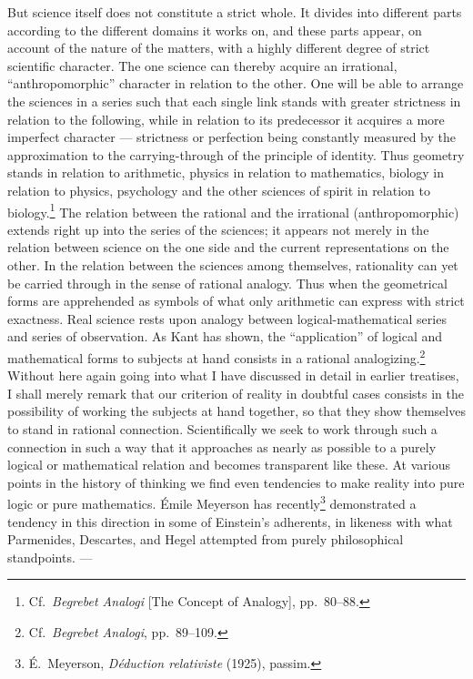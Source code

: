 \documentclass[12pt]{book}
\newcommand{\opage}[1]{\marginnote{\footnotesize\textit{[#1]}}}
\begin{document}
But science itself does not constitute a strict whole. It divides into different parts according
to the different domains it works on, and these parts appear, on account of the nature of the
matters, with a highly different degree of strict scientific character. The one science can
thereby acquire an irrational, ``anthropomorphic'' character in relation to the other. One will be
able to arrange the sciences in a series \opage{11}such that each single link stands with greater strictness
in relation to the following, while in relation to its predecessor it acquires a more imperfect
character --- strictness or perfection being constantly measured by the approximation to the
carrying-through of the principle of identity. Thus geometry stands in relation to arithmetic,
physics in relation to mathematics, biology in relation to physics, psychology and the other
sciences of spirit in relation to biology.\footnote{Cf.\ \textit{Begrebet Analogi} [The Concept
of Analogy], pp.\ 80--88.} The relation between the rational and the irrational
(anthropomorphic) extends right up into the series of the sciences; it appears not merely in the
relation between science on the one side and the current representations on the other. In the
relation between the sciences among themselves, rationality can yet be carried through in the
sense of rational analogy. Thus when the geometrical forms are apprehended as symbols of what
only arithmetic can express with strict exactness. Real science rests upon analogy between
logical-mathematical series and series of observation. As Kant has shown, the ``application'' of
logical and mathematical forms to subjects at hand consists in a rational analogizing.\footnote{Cf.\
\textit{Begrebet Analogi}, pp.\ 89--109.} Without here again going into what I have discussed in
detail in earlier treatises, I shall merely remark that our criterion of reality in doubtful cases
consists in the possibility of working the subjects at hand together, so that they show themselves
to stand in rational connection. Scientifically we seek to work through such a connection in such a
way that it approaches as nearly as possible to a purely logical or mathematical relation and
becomes transparent like these. At various points in the history of thinking we find even
tendencies to make reality into pure logic or pure mathematics. \opage{12}Émile Meyerson has recently\footnote{É.\
Meyerson, \textit{Déduction relativiste} (1925), passim.} demonstrated a tendency in this direction
in some of Einstein's adherents, in likeness with what Parmenides, Descartes, and Hegel attempted
from purely philosophical standpoints. ---
\end{document}
